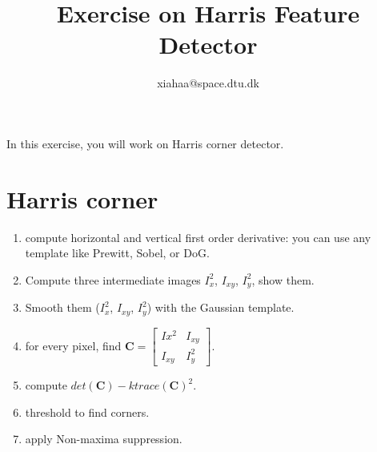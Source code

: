 \documentclass[a4paper]{article}
\begin{document}
\title{Exercise on Harris Feature Detector}
\author{xiahaa@space.dtu.dk}
\maketitle%

In this exercise, you will work on Harris corner detector.

\section{Harris corner}
\begin{enumerate}
\item compute horizontal and vertical first order derivative: you can use any template like Prewitt, Sobel, or DoG. 
\item Compute three intermediate images $I_x^2$, $I_{xy}$, $I_y^2$, show them.
\item Smooth them ($I_x^2$, $I_{xy}$, $I_y^2$) with the Gaussian template.
\item for every pixel, find $\mathbf{C}=\left[\begin{matrix}
Ix^2 & I_{xy} \\ I_{xy} & I_{y}^2
\end{matrix}\right]$.
\item compute $det(\mathbf{C})-\mathit{k}trace(\mathbf{C})^2$.
\item threshold to find corners.
\item apply Non-maxima suppression.
\end{enumerate}
\end{document}
